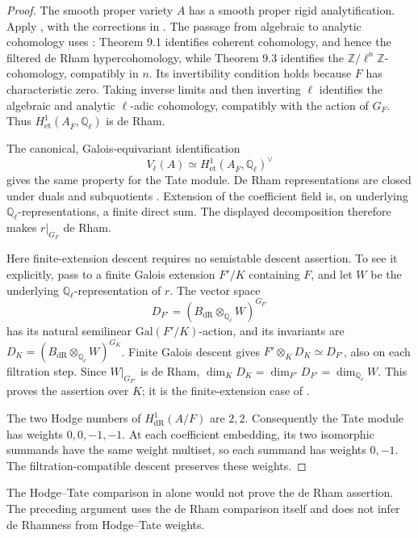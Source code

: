 \documentclass[11pt]{article}
\theoremstyle{definition}
\theoremstyle{remark}
\begin{document}
\begin{proof}
The smooth proper variety $A$ has a smooth proper rigid
analytification. Apply \cite[Corollary 1.8]{scholze2013}, with the
corrections in \cite{scholze-erratum}. The passage from algebraic
to analytic cohomology uses \cite[Theorems 9.1 and 9.3]{scholze2013}:
Theorem 9.1 identifies coherent cohomology, and hence the filtered
de Rham hypercohomology, while Theorem 9.3 identifies the
$\mathbb Z/\ell^n\mathbb Z$-cohomology, compatibly in $n$.
Its invertibility condition holds because $F$ has characteristic
zero. Taking inverse limits and then inverting $\ell$ identifies
the algebraic and analytic $\ell$-adic cohomology, compatibly with
the action of $G_F$. Thus
$H^1_{\mathrm{et}}(A_{\overline F},\mathbb Q_\ell)$ is de Rham.

The canonical, Galois-equivariant identification
\cite[Part I, Theorem 12.1(a)]{milne-av}
\[
 V_\ell(A)\simeq
 H^1_{\mathrm{et}}(A_{\overline F},\mathbb Q_\ell)^\vee
\]
gives the same property for the Tate module. De Rham representations
are closed under duals and subquotients
\cite[Theorem 5.2.1 and Proposition 6.3.3]{brinon-conrad}.
Extension of the coefficient field is, on underlying
$\mathbb Q_\ell$-representations, a finite direct sum.
The displayed decomposition therefore makes $r|_{G_F}$ de Rham.

Here finite-extension descent requires no semistable descent
assertion. To see it explicitly, pass to a finite Galois extension
$F'/K$ containing $F$, and let $W$ be the underlying
$\mathbb Q_\ell$-representation of $r$. The vector space
\[
 D_{F'}=(B_{\mathrm{dR}}\otimes_{\mathbb Q_\ell}W)^{G_{F'}}
\]
has its natural semilinear $\mathrm{Gal}(F'/K)$-action, and its
invariants are
$D_K=(B_{\mathrm{dR}}\otimes_{\mathbb Q_\ell}W)^{G_K}$.
Finite Galois descent gives $F'\otimes_K D_K\simeq D_{F'}$,
also on each filtration step. Since $W|_{G_{F'}}$ is de Rham,
$\dim_K D_K=\dim_{F'}D_{F'}=\dim_{\mathbb Q_\ell}W$.
This proves the assertion over $K$; it is the finite-extension
case of \cite[Proposition 6.3.8]{brinon-conrad}.

The two Hodge numbers of $H^1_{\mathrm{dR}}(A/F)$ are $2,2$.
Consequently the Tate module has weights $0,0,-1,-1$.
At each coefficient embedding, its two isomorphic summands
have the same weight multiset, so each summand has weights $0,-1$.
The filtration-compatible descent preserves these weights.
\end{proof}

The Hodge--Tate comparison in \cite[Chapter III, Theorem 4.1]{faltings1988}
alone would not prove the de Rham assertion. The preceding argument
uses the de Rham comparison itself and does not infer de Rhamness
from Hodge--Tate weights.
\end{document}
